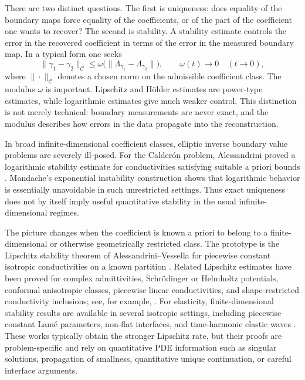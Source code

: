\documentclass[12pt,oneside]{amsart}
\begin{document}
There are two distinct questions.  The first is uniqueness: does equality of the
boundary maps force equality of the coefficients, or of the part of the
coefficient one wants to recover?  The second is stability.  A stability estimate
controls the error in the recovered coefficient in terms of the error in the
measured boundary map.  In a typical form one seeks
\[
        \|\gamma_1-\gamma_2\|_{\mathcal C}
        \le
        \omega\bigl(\|\Lambda_{\gamma_1}-\Lambda_{\gamma_2}\|\bigr),
        \qquad \omega(t)\to0\quad(t\to0),
\]
where \(\|\cdot\|_{\mathcal C}\) denotes a chosen norm on the admissible
coefficient class.  The modulus \(\omega\) is important.  Lipschitz and
H\"older estimates are power-type estimates, while logarithmic estimates give
much weaker control.  This distinction is not merely technical: boundary
measurements are never exact, and the modulus describes how errors in the data
propagate into the reconstruction.

In broad infinite-dimensional coefficient classes, elliptic inverse boundary
value problems are severely ill-posed.  For the Calder\'on problem,
Alessandrini proved a logarithmic stability estimate for conductivities
satisfying suitable a priori bounds \cite{Alessandrini1988}.  Mandache's
exponential instability construction \cite{Mandache2001} shows that logarithmic
behavior is essentially unavoidable in such unrestricted settings.  Thus exact
uniqueness does not by itself imply useful quantitative stability in the usual
infinite-dimensional regimes.

The picture changes when the coefficient is known a priori to belong to a
finite-dimensional or otherwise geometrically restricted class.  The prototype
is the Lipschitz stability theorem of Alessandrini--Vessella for piecewise
constant isotropic conductivities on a known partition
\cite{AlessandriniVessella2005}.  Related Lipschitz estimates have been proved
for complex admittivities, Schr\"odinger or Helmholtz potentials, conformal
anisotropic classes, piecewise linear conductivities, and shape-restricted
conductivity inclusions; see, for example,
\cite{BerettaFrancini2011,BerettaDeHoopQiu2013,GaburroSincich2015,AlessandriniDeHoopGaburroSincich2017,AspriBerettaFranciniVessella2022}.
For elasticity, finite-dimensional stability results are available in several
isotropic settings, including piecewise constant Lam\'e parameters, non-flat
interfaces, and time-harmonic elastic waves
\cite{BerettaFranciniVessella2014,BerettaFranciniMorassiRossetVessella2014,BerettaDeHoopFranciniVessellaZhai2017}.
These works typically obtain the stronger Lipschitz rate, but their proofs are
problem-specific and rely on quantitative PDE information such as singular
solutions, propagation of smallness, quantitative unique continuation, or
careful interface arguments.
\end{document}
